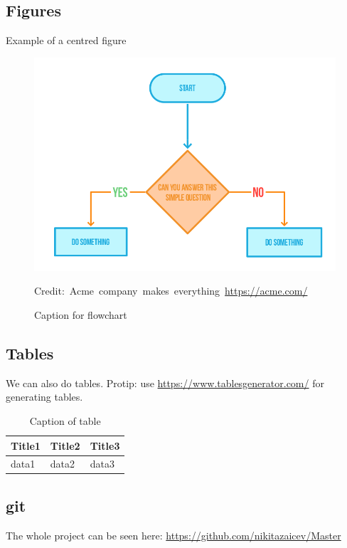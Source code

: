 \subsection{Figures}

Example of a centred figure
\begin{figure}[H]
    \centering
    \includegraphics[scale=0.5]{figures/Flowchart}
    \caption{Caption for flowchart}
  	\medskip 
	\hspace*{15pt}\hbox{\scriptsize Credit: Acme company makes everything \url{https://acme.com/}}
    \label{FlowchartFigure}
\end{figure}

\subsection{Tables}

We can also do tables. Protip: use \url{https://www.tablesgenerator.com/} for generating tables.
\begin{table}[H]
\centering
\caption{Caption of table}
\label{TableLabel}
\begin{tabular}{|l|l|l|}
\hline
Title1 & Title2 & Title3 \\ \hline
data1  & data2  & data3  \\ \hline
\end{tabular}
\end{table}

\subsection{\gls{git}}

The whole project can be seen here: \url{https://github.com/nikitazaicev/Master}